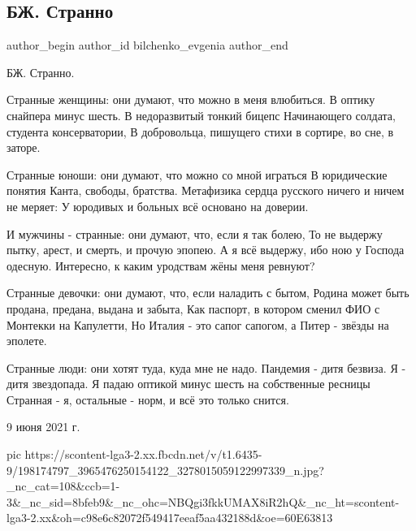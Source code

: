  
 
 
 
 
 
\subsection{БЖ. Странно}
\label{sec:09_06_2021.fb.bilchenko_evgenia.1.stranno}
\ifcmt
 author_begin
   author_id bilchenko_evgenia
 author_end
\fi

БЖ. Странно.

Странные женщины: они думают, что можно в меня влюбиться.
В оптику снайпера минус шесть. В недоразвитый тонкий бицепс
Начинающего солдата, студента консерватории,
В добровольца, пишущего стихи в сортире, во сне, в заторе.

Странные юноши: они думают, что можно со мной играться
В юридические понятия Канта, свободы, братства.
Метафизика сердца русского ничего и ничем не меряет:
У юродивых и больных всё основано на доверии.

И мужчины - странные: они думают, что, если я так болею,
То не выдержу пытку, арест, и смерть, и прочую эпопею.
А я всё выдержу, ибо ною у Господа одесную.
Интересно, к каким уродствам жёны меня ревнуют?

Странные девочки: они думают, что, если наладить с бытом,
Родина может быть продана, предана, выдана и забыта,
Как паспорт, в котором сменил ФИО  с Монтекки на Капулетти,
Но Италия - это сапог сапогом, а Питер - звёзды на эполете.

Странные люди: они хотят туда, куда мне не надо.
Пандемия - дитя безвиза. Я - дитя звездопада.
Я падаю оптикой минус шесть на собственные ресницы
Странная - я, остальные - норм, и всё это только снится.

9 июня 2021 г.

\ifcmt
  pic https://scontent-lga3-2.xx.fbcdn.net/v/t1.6435-9/198174797_3965476250154122_3278015059122997339_n.jpg?_nc_cat=108&ccb=1-3&_nc_sid=8bfeb9&_nc_ohc=NBQgi3fkkUMAX8iR2hQ&_nc_ht=scontent-lga3-2.xx&oh=c98e6c82072f549417eeaf5aa432188d&oe=60E63813
\fi
